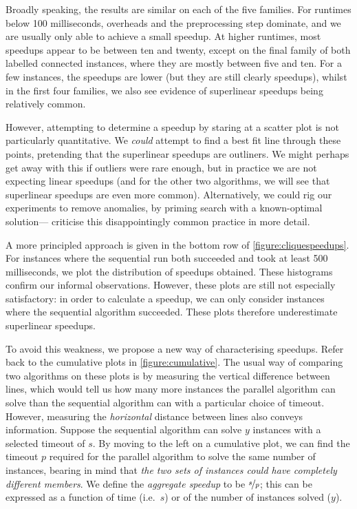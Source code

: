 \documentclass[sigconf]{acmart}
\begin{document}
Broadly speaking, the results are similar on each of the five families. For runtimes below 100
milliseconds, overheads and the preprocessing step dominate, and we are usually only able to achieve
a small speedup. At higher runtimes, most speedups appear to be between ten and twenty, except on
the final family of both labelled connected instances, where they are mostly between five and ten.
For a few instances, the speedups are lower (but they are still clearly speedups), whilst in the
first four families, we also see evidence of superlinear speedups being relatively common.

However, attempting to determine a speedup by staring at a scatter plot is not particularly
quantitative. We \emph{could} attempt to find a best fit line through these points, pretending that
the superlinear speedups are outliners. We might perhaps get away with this if outliers were rare
enough, but in practice we are not expecting linear speedups (and for the other two algorithms, we
will see that superlinear speedups are even more common). Alternatively, we could rig our
experiments to remove anomalies, by priming search with a known-optimal
solution---\citet{DBLP:journals/topc/McCreeshP15} criticise this disappointingly common practice in
more detail.

A more principled approach is given in the bottom row of \cref{figure:cliquespeedups}. For instances
where the sequential run both succeeded and took at least 500 milliseconds, we plot the distribution
of speedups obtained. These histograms confirm our informal observations. However, these plots are
still not especially satisfactory: in order to calculate a speedup, we can only consider instances
where the sequential algorithm succeeded. These plots therefore underestimate superlinear speedups.

To avoid this weakness, we propose a new way of characterising speedups. Refer back to the
cumulative plots in \cref{figure:cumulative}. The usual way of comparing two algorithms on these
plots is by measuring the vertical difference between lines, which would tell us how many more
instances the parallel algorithm can solve than the sequential algorithm can with a particular
choice of timeout.  However, measuring the \emph{horizontal} distance between lines also conveys
information. Suppose the sequential algorithm can solve $y$ instances with a selected timeout of
$s$. By moving to the left on a cumulative plot, we can find the timeout $p$ required for the
parallel algorithm to solve the same number of instances, bearing in mind that \emph{the two sets of
instances could have completely different members}. We define the \emph{aggregate speedup} to be
$\nicefrac{s}{p}$; this can be expressed as a function of time (i.e.\ $s$) or of the number of
instances solved ($y$).
\end{document}
